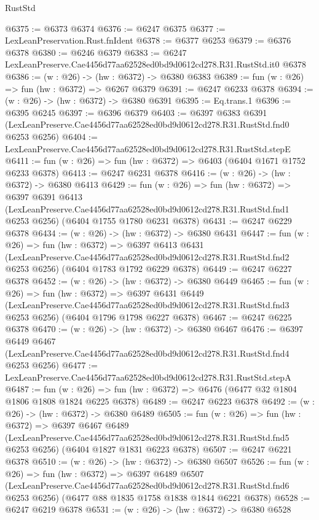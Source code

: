 \begin{lexlean}{RustStd}
\begin{coremodule}
@6375 := @6373 @6374
@6376 := @6247 @6375
@6377 := LexLeanPreservation.Rust.fnIdent
@6378 := @6377 @6253
@6379 := @6376 @6378
@6380 := @6246 @6379
@6383 := @6247 LexLeanPreserve.Cae4456d77aa62528ed0bd9d0612cd278.R31.RustStd.it0 @6378
@6386 := (w : @26) -> (hw : @6372) -> @6380 @6383
@6389 := fun (w : @26) => fun (hw : @6372) => @6267 @6379
@6391 := @6247 @6233 @6378
@6394 := (w : @26) -> (hw : @6372) -> @6380 @6391
@6395 := Eq.trans.{1}
@6396 := @6395 @6245
@6397 := @6396 @6379
@6403 := @6397
    @6383
    @6391
    (LexLeanPreserve.Cae4456d77aa62528ed0bd9d0612cd278.R31.RustStd.fnd0 @6253 @6256)
@6404 := LexLeanPreserve.Cae4456d77aa62528ed0bd9d0612cd278.R31.RustStd.stepE
@6411 := fun (w : @26) => fun (hw : @6372) => @6403 (@6404 @1671 @1752 @6233 @6378)
@6413 := @6247 @6231 @6378
@6416 := (w : @26) -> (hw : @6372) -> @6380 @6413
@6429 := fun (w : @26) =>
  fun (hw : @6372) =>
  @6397
    @6391
    @6413
    (LexLeanPreserve.Cae4456d77aa62528ed0bd9d0612cd278.R31.RustStd.fnd1 @6253 @6256)
    (@6404 @1755 @1780 @6231 @6378)
@6431 := @6247 @6229 @6378
@6434 := (w : @26) -> (hw : @6372) -> @6380 @6431
@6447 := fun (w : @26) =>
  fun (hw : @6372) =>
  @6397
    @6413
    @6431
    (LexLeanPreserve.Cae4456d77aa62528ed0bd9d0612cd278.R31.RustStd.fnd2 @6253 @6256)
    (@6404 @1783 @1792 @6229 @6378)
@6449 := @6247 @6227 @6378
@6452 := (w : @26) -> (hw : @6372) -> @6380 @6449
@6465 := fun (w : @26) =>
  fun (hw : @6372) =>
  @6397
    @6431
    @6449
    (LexLeanPreserve.Cae4456d77aa62528ed0bd9d0612cd278.R31.RustStd.fnd3 @6253 @6256)
    (@6404 @1796 @1798 @6227 @6378)
@6467 := @6247 @6225 @6378
@6470 := (w : @26) -> (hw : @6372) -> @6380 @6467
@6476 := @6397
    @6449
    @6467
    (LexLeanPreserve.Cae4456d77aa62528ed0bd9d0612cd278.R31.RustStd.fnd4 @6253 @6256)
@6477 := LexLeanPreserve.Cae4456d77aa62528ed0bd9d0612cd278.R31.RustStd.stepA
@6487 := fun (w : @26) => fun (hw : @6372) => @6476 (@6477 @32 @1804 @1806 @1808 @1824 @6225 @6378)
@6489 := @6247 @6223 @6378
@6492 := (w : @26) -> (hw : @6372) -> @6380 @6489
@6505 := fun (w : @26) =>
  fun (hw : @6372) =>
  @6397
    @6467
    @6489
    (LexLeanPreserve.Cae4456d77aa62528ed0bd9d0612cd278.R31.RustStd.fnd5 @6253 @6256)
    (@6404 @1827 @1831 @6223 @6378)
@6507 := @6247 @6221 @6378
@6510 := (w : @26) -> (hw : @6372) -> @6380 @6507
@6526 := fun (w : @26) =>
  fun (hw : @6372) =>
  @6397
    @6489
    @6507
    (LexLeanPreserve.Cae4456d77aa62528ed0bd9d0612cd278.R31.RustStd.fnd6 @6253 @6256)
    (@6477 @88 @1835 @1758 @1838 @1844 @6221 @6378)
@6528 := @6247 @6219 @6378
@6531 := (w : @26) -> (hw : @6372) -> @6380 @6528

\end{coremodule}
\end{lexlean}
